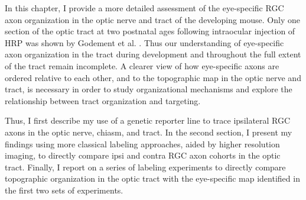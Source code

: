 In this chapter, I provide a more detailed assessment of the eye-specific RGC axon organization in the optic nerve and tract of the developing mouse.
Only one section of the optic tract at two postnatal ages following intraocular injection of HRP was shown by Godement et al. .
Thus our understanding of eye-specific axon organization in the tract during development and throughout the full extent of the tract remain incomplete.
A clearer view of how eye-specific axons are ordered relative to each other, and to the topographic map in the optic nerve and tract, is necessary in order to study organizational mechanisms and explore the relationship between tract organization and targeting.

Thus, I first describe my use of a genetic reporter line to trace ipsilateral RGC axons in the optic nerve, chiasm, and tract.
In the second section, I present my findings using more classical labeling approaches, aided by higher resolution imaging, to directly compare ipsi and contra RGC axon cohorts in the optic tract.
Finally, I report on a series of labeling experiments to directly compare topographic organization in the optic tract with the eye-specific map identified in the first two sets of experiments.